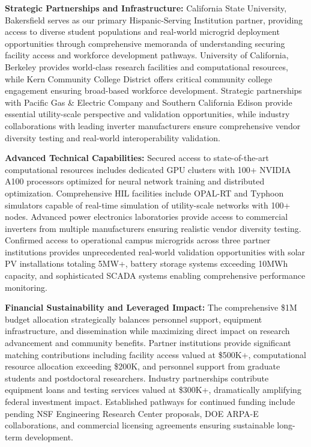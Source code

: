 \documentclass[12pt]{article}
\begin{document}
\textbf{Strategic Partnerships and Infrastructure:} California State University, Bakersfield serves as our primary Hispanic-Serving Institution partner, providing access to diverse student populations and real-world microgrid deployment opportunities through comprehensive memoranda of understanding securing facility access and workforce development pathways. University of California, Berkeley provides world-class research facilities and computational resources, while Kern Community College District offers critical community college engagement ensuring broad-based workforce development. Strategic partnerships with Pacific Gas \& Electric Company and Southern California Edison provide essential utility-scale perspective and validation opportunities, while industry collaborations with leading inverter manufacturers ensure comprehensive vendor diversity testing and real-world interoperability validation.

\textbf{Advanced Technical Capabilities:} Secured access to state-of-the-art computational resources includes dedicated GPU clusters with 100+ NVIDIA A100 processors optimized for neural network training and distributed optimization. Comprehensive HIL facilities include OPAL-RT and Typhoon simulators capable of real-time simulation of utility-scale networks with 100+ nodes. Advanced power electronics laboratories provide access to commercial inverters from multiple manufacturers ensuring realistic vendor diversity testing. Confirmed access to operational campus microgrids across three partner institutions provides unprecedented real-world validation opportunities with solar PV installations totaling 5MW+, battery storage systems exceeding 10MWh capacity, and sophisticated SCADA systems enabling comprehensive performance monitoring.

\textbf{Financial Sustainability and Leveraged Impact:} The comprehensive \$1M budget allocation \cite{nrel2021} strategically balances personnel support, equipment infrastructure, and dissemination while maximizing direct impact on research advancement and community benefits. Partner institutions provide significant matching contributions including facility access valued at \$500K+, computational resource allocation exceeding \$200K, and personnel support from graduate students and postdoctoral researchers. Industry partnerships contribute equipment loans and testing services valued at \$300K+, dramatically amplifying federal investment impact. Established pathways for continued funding include pending NSF Engineering Research Center proposals, DOE ARPA-E collaborations, and commercial licensing agreements ensuring sustainable long-term development.
\end{document}
